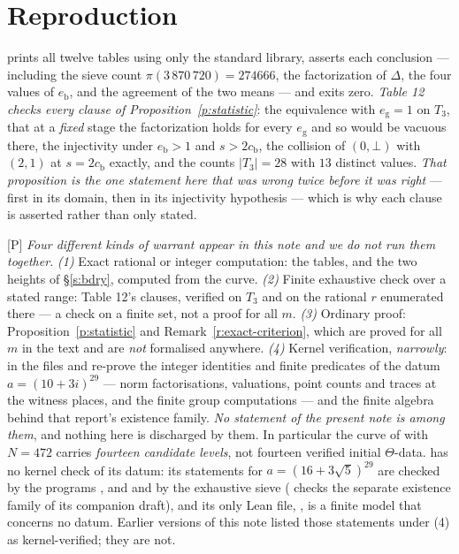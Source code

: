 \documentclass[11pt]{article}
\theoremstyle{plain}
\theoremstyle{definition}
\begin{document}
\section*{Reproduction}

 prints all twelve tables using only the standard library,
asserts each conclusion --- including the sieve count $\pi(3\,870\,720)=274666$, the
factorization of $\Delta$, the four values of $e_{\mathrm b}$, and the agreement of the
two means --- and exits zero.  \emph{Table 12 checks every clause of
Proposition~\ref{p:statistic}}: the equivalence with $e_{\mathrm g}=1$ on $T_3$, that
at a \emph{fixed} stage the factorization holds for every $e_{\mathrm g}$ and so would
be vacuous there, the injectivity under $e_{\mathrm b}>1$ and $s>2c_{\mathrm b}$, the
collision of $(0,\bot)$ with $(2,1)$ at $s=2c_{\mathrm b}$ exactly, and the counts
$|T_3|=28$ with $13$ distinct values.  \emph{That proposition is the one statement
here that was wrong twice before it was right} --- first in its domain, then in its
injectivity hypothesis --- which is why each clause is asserted rather than only
stated.

\textup{[P]} \emph{Four different kinds of warrant appear in this note and we do not
run them together.}  \emph{(1)} Exact rational or integer computation: the tables, and
the two heights of \S\ref{s:bdry}, computed from the curve.  \emph{(2)} Finite
exhaustive check over a stated range: Table 12's clauses, verified on $T_3$ and on the
rational $r$ enumerated there --- a check on a finite set, not a proof for all $m$.
\emph{(3)} Ordinary proof: Proposition~\ref{p:statistic} and
Remark~\ref{r:exact-criterion}, which are proved for all $m$ in the text and are
\emph{not} formalised anywhere.  \emph{(4)} Kernel verification, \emph{narrowly}: in
\cite{Second} the files  and
 re-prove the integer identities and finite predicates of the
datum $a=(10+3i)^{29}$ --- norm factorisations, valuations, point counts and traces at
the witness places, and the finite group computations --- and
 the finite algebra behind that report's existence family.
\emph{No statement of the present note is among them}, and nothing here is discharged
by them.  In particular the curve of \cite[\S13]{Second} with $N=472$ carries
\emph{fourteen candidate levels}, not fourteen verified initial $\Theta$-data.
\cite{First} has no kernel check of its datum: its statements for
$a=(16+3\sqrt5)^{29}$ are checked by the programs ,
 and  and by the
exhaustive sieve 
( checks the separate existence family of its
companion draft), and its only Lean file, , is a
finite model that concerns no datum.  Earlier versions of this note listed those
statements under (4) as kernel-verified; they are not.
\end{document}
